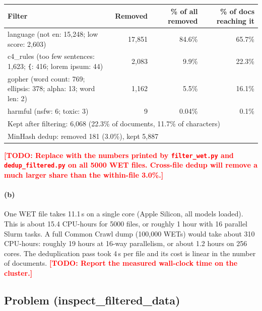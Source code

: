 \documentclass[11pt]{article}
\newcommand{\todo}[1]{\textcolor{red}{\textbf{[TODO: #1]}}}
\begin{document}
\begin{center}
\begin{tabular}{lrrr}
\toprule
Filter & Removed & \% of all removed & \% of docs reaching it \\
\midrule
language (not en: 15{,}248; low score: 2{,}603) & 17{,}851 & 84.6\% & 65.7\% \\
c4\_rules (too few sentences: 1{,}623; \texttt{\{}: 416; lorem ipsum: 44) & 2{,}083 & 9.9\% & 22.3\% \\
gopher (word count: 769; ellipsis: 378; alpha: 13; word len: 2) & 1{,}162 & 5.5\% & 16.1\% \\
harmful (nsfw: 6; toxic: 3) & 9 & 0.04\% & 0.1\% \\
\midrule
\multicolumn{4}{l}{Kept after filtering: 6{,}068 (22.3\% of documents, 11.7\% of characters)} \\
\multicolumn{4}{l}{MinHash dedup: removed 181 (3.0\%), kept 5{,}887} \\
\bottomrule
\end{tabular}
\end{center}

\todo{Replace with the numbers printed by \texttt{filter\_wet.py} and \texttt{dedup\_filtered.py} on all 5000
WET files. Cross-file dedup will remove a much larger share than the within-file 3.0\%.}

\paragraph{(b)} One WET file takes 11.1\,s on a single core (Apple Silicon, all models loaded). This is
about 15.4 CPU-hours for 5000 files, or roughly 1 hour with 16 parallel Slurm tasks. A full
Common Crawl dump (100{,}000 WETs) would take about 310 CPU-hours: roughly 19 hours at 16-way
parallelism, or about 1.2 hours on 256 cores. The deduplication pass took 4\,s per file and its
cost is linear in the number of documents.
\todo{Report the measured wall-clock time on the cluster.}

\subsection*{Problem (inspect\_filtered\_data)}
\end{document}
